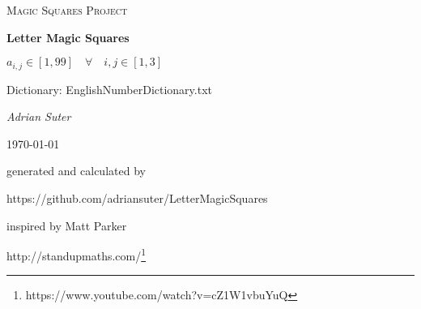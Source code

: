 \documentclass{article}
\begin{document}
\begin{titlepage}
\centering
{\scshape\LARGE Magic Squares Project\par}
\vspace{1.5cm}
{\huge\bfseries Letter Magic Squares\par}
\vspace{1.5cm}
{\large $a_{i,j} \in [1, 99] \hspace{1em} \forall \hspace{1em} i,j \in [1,3]$\par
Dictionary: EnglishNumberDictionary.txt\par
}\vspace{5cm}
{\Large\itshape Adrian Suter\par}
\vspace{1cm}
{\large \today\par}
\vfill
generated and calculated by\par
https://github.com/adriansuter/LetterMagicSquares\par
\vspace{1cm}
inspired by Matt Parker\par
http://standupmaths.com/\footnote{https://www.youtube.com/watch?v=cZ1W1vbuYuQ}\par
\vspace{2cm}
\end{titlepage}
\end{document}
